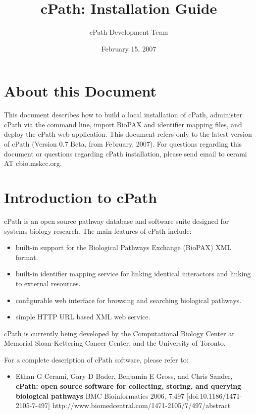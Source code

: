 \documentclass[letterpaper,12pt]{article}
\title{cPath:  Installation Guide}
\author{cPath Development Team}
\date{February 15, 2007}
\begin{document}
\maketitle

\tableofcontents

\section{About this Document}

This document describes how to build a local installation of cPath, administer cPath via the command line, import BioPAX and identifier mapping files, and deploy the cPath web application.  This document refers only to the latest version of cPath (Version 0.7 Beta, from February, 2007).  For questions regarding this document or questions regarding cPath installation, please send email to cerami AT cbio.mskcc.org.

\section{Introduction to cPath}

cPath is an open source pathway database and software suite designed for systems biology research. The main features of cPath include:

\begin{itemize}

  \item built-in support for the Biological Pathways Exchange (BioPAX) XML format.

  \item built-in identifier mapping service for linking identical interactors and linking to external resources.

  \item configurable web interface for browsing and searching biological pathways.

  \item simple HTTP URL based XML web service.

\end{itemize}

cPath is currently being developed by the Computational Biology Center at Memorial Sloan-Kettering Cancer Center, and the University of Toronto.

\bigskip

For a complete description of cPath software, please refer to:

\begin{itemize}
\item Ethan G Cerami, Gary D Bader, Benjamin E Gross, and Chris Sander, \textbf{cPath: open source software for collecting, storing, and querying biological pathways} BMC Bioinformatics 2006, 7:497 [doi:10.1186/1471-2105-7-497]
http://www.biomedcentral.com/1471-2105/7/497/abstract
\end{itemize}
\end{document}
